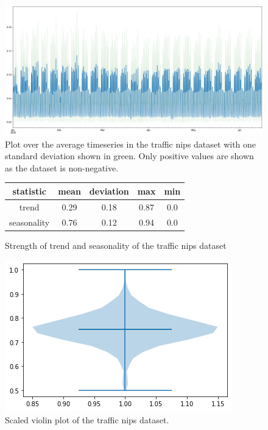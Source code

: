 \begin{figure}[htb]
  \centering
  \includegraphics[width=\linewidth]{./img/traffic_nips_plot.png}
  \caption{Plot over the average timeseries in the traffic nips dataset with one standard deviation shown in green. Only positive values are shown as the dataset is non-negative.}
  \label{fig:traffic_nips_plot}
  \endminipage\hfill
\end{figure}

\begin{figure}[htb]
  \centering
  \begin{center}
    \begin{tabular}{||c | c | c | c | c |}
      \hline
      statistic   & mean & deviation & max  & min \\
      \hline
      trend       & 0.29 & 0.18      & 0.87 & 0.0 \\
      \hline
      seasonality & 0.76 & 0.12      & 0.94 & 0.0 \\
      \hline
      \hline
    \end{tabular}
    \caption{Strength of trend and seasonality of the traffic nips dataset}
  \end{center}
  \endminipage\hfill
  \includegraphics[width=\linewidth]{./img/traffic_nips_violin.png}
  \caption{Scaled violin plot of the traffic nips dataset.}
  \label{fig:traffic_nips_violin}
  \endminipage\hfill
\end{figure}
\clearpage
